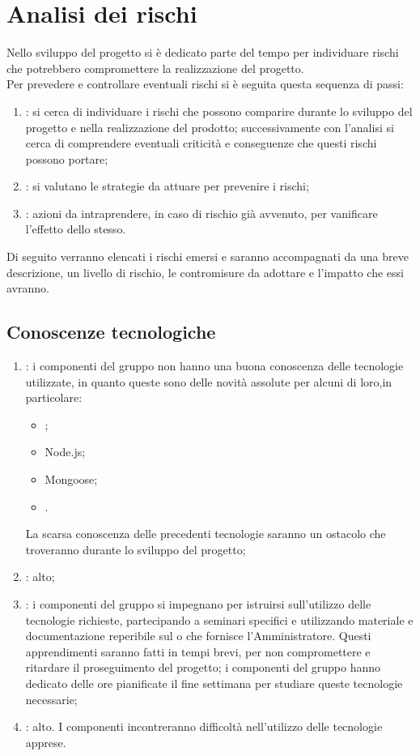 \section{Analisi dei rischi}
Nello sviluppo del progetto si è dedicato parte del tempo per individuare rischi che potrebbero compromettere la realizzazione del progetto.\\
Per prevedere e controllare eventuali rischi si è seguita questa sequenza di passi:
\begin{enumerate}
\item {}: si cerca di individuare i rischi che possono comparire durante lo sviluppo del progetto e nella realizzazione del prodotto; successivamente con l'analisi si cerca di comprendere eventuali criticità e conseguenze che questi rischi possono portare;
\item {}: si valutano le strategie da attuare  per prevenire i rischi;
\item {}: azioni da intraprendere, in caso di rischio già avvenuto, per vanificare l'effetto dello stesso.
\end{enumerate}
Di seguito verranno elencati i rischi emersi e saranno accompagnati da una breve descrizione, un livello di rischio, le contromisure da adottare e l'impatto che essi avranno.

\subsection{Conoscenze tecnologiche}
\begin{enumerate}
\item {}: i componenti del gruppo non hanno una buona conoscenza delle tecnologie utilizzate, in quanto queste sono delle novità assolute per alcuni di loro,in particolare:
\begin{itemize}
\item {};
\item Node.js;
\item Mongoose;
\item {}.
\end{itemize}
La scarsa conoscenza delle precedenti tecnologie saranno un ostacolo che troveranno durante lo sviluppo del progetto;
\item {}: alto;
\item {}: i componenti del gruppo si impegnano per istruirsi sull'utilizzo delle tecnologie richieste, partecipando a seminari specifici e utilizzando materiale e documentazione reperibile sul  o che fornisce l'Amministratore. Questi apprendimenti saranno fatti in tempi brevi, per non compromettere e ritardare il proseguimento del progetto; i componenti del gruppo hanno dedicato delle ore pianificate il fine settimana per studiare queste tecnologie necessarie;
\item {}: alto. I componenti incontreranno difficoltà nell'utilizzo delle tecnologie apprese.
\end{enumerate}

